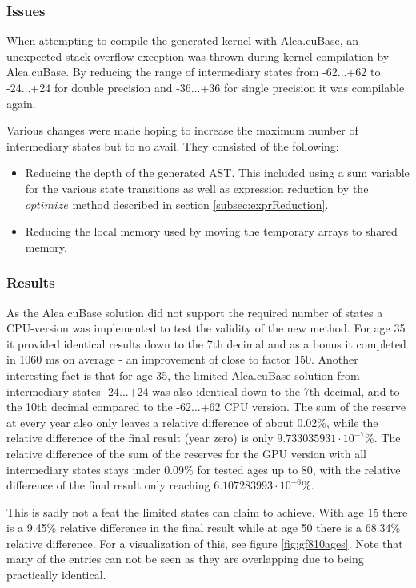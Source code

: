 \subsubsection{Issues}
When attempting to compile the generated kernel with Alea.cuBase, an unexpected stack overflow exception was thrown during kernel compilation by Alea.cuBase.
By reducing the range of intermediary states from -62...+62 to -24...+24 for double precision and -36...+36 for single precision it was compilable again.

Various changes were made hoping to increase the maximum number of intermediary states but to no avail.
They consisted of the following:
\begin{itemize}
\item Reducing the depth of the generated AST. This included using a sum variable for the various state transitions as well as expression reduction by the $optimize$ method described in section \ref{subsec:exprReduction}.
\item Reducing the local memory used by moving the temporary arrays to shared memory.
\end{itemize}

\subsubsection{Results}
As the Alea.cuBase solution did not support the required number of states a CPU-version was implemented to test the validity of the new method.
For age 35 it provided identical results down to the 7th decimal and as a bonus it completed in 1060 ms on average - an improvement of close to factor 150.
Another interesting fact is that for age 35, the limited Alea.cuBase solution from intermediary states -24...+24 was also identical down to the 7th decimal, and to the 10th decimal compared to the -62...+62 CPU version.
The sum of the reserve at every year also only leaves a relative difference of about 0.02\%, while the relative difference of the final result (year zero) is only $9.733035931 \cdot 10^{-7}\%$.
The relative difference of the sum of the reserves for the GPU version with all intermediary states stays under 0.09\% for tested ages up to 80, with the relative difference of the final result only reaching $6.107283993 \cdot 10^{-6}$\%.

This is sadly not a feat the limited states can claim to achieve. 
With age 15 there is a 9.45\% relative difference in the final result while at age 50 there is a 68.34\% relative difference.
For a visualization of this, see figure \ref{fig:gf810ages}. 
Note that many of the entries can not be seen as they are overlapping due to being practically identical.

